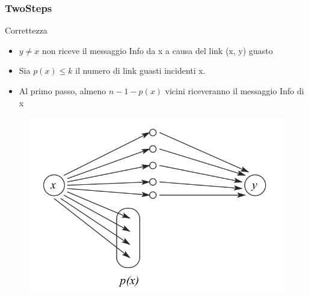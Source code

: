 		\begin{frame}
			\frametitle{TwoSteps}
			\begin{block}{Correttezza}
				\begin{itemize}
					\item $y \neq x$ non riceve il messaggio Info da x a causa del link (x, y) guasto
					\item Sia $p(x) \leq k$ il numero di link guasti incidenti x.
					\item Al primo passo, almeno $n - 1 - p(x)$ vicini riceveranno il messaggio Info di x
				\end{itemize}				
			\end{block}
			\begin{center}
				\begin{figure}
					\includegraphics[scale=0.35]{img/twoSteps}
				\end{figure}
			\end{center}
		\end{frame}
	
